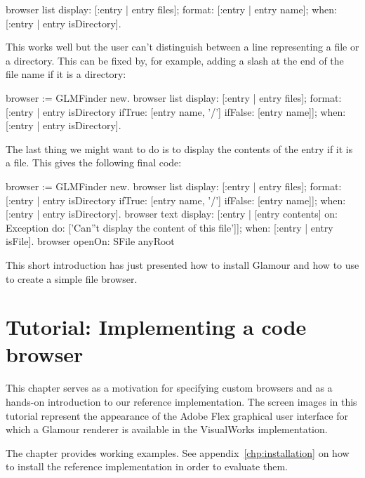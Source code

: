 \documentclass[a4paper,10pt,twoside]{book}
\begin{document}
\begin{code}{}
browser list
  display: [:entry | entry files];
  format: [:entry | entry name];
  when: [:entry | entry isDirectory].
\end{code}

This works well but the user can't distinguish between a line
representing a file or a directory. This can be fixed by, for example,
adding a slash at the end of the file name if it is a directory:

\begin{code}{}
browser := GLMFinder new.
browser list
  display: [:entry | entry files];
  format: [:entry | entry isDirectory
                                   ifTrue: [entry name, '/']
                                   ifFalse: [entry name]];
  when: [:entry | entry isDirectory].
\end{code}

The last thing we might want to do is to display the contents of the
entry if it is a file. This gives the following final code:

\begin{code}{}
browser := GLMFinder new.
browser list
  display: [:entry | entry files];
  format: [:entry | entry isDirectory
                                   ifTrue: [entry name, '/']
                                   ifFalse: [entry name]];
  when: [:entry | entry isDirectory].
browser text
	display: [:entry | [entry contents]
                                   on: Exception
                                   do: ['Can''t display the content of this file']];
	when: [:entry | entry isFile].
browser openOn: SFile anyRoot
\end{code}


This short introduction has just presented how to install Glamour and
how to use to create a simple file browser.

\section{Tutorial: Implementing a code browser}

This chapter serves as a motivation for specifying custom browsers and as a hands-on introduction to our reference implementation. The screen images in this tutorial represent the appearance of the Adobe Flex \cite{Adob06a} graphical user interface for which a Glamour renderer is available in the VisualWorks implementation.

The chapter provides working examples. See appendix~\ref{chp:installation} on how to install the reference implementation in order to evaluate them.
\end{document}
